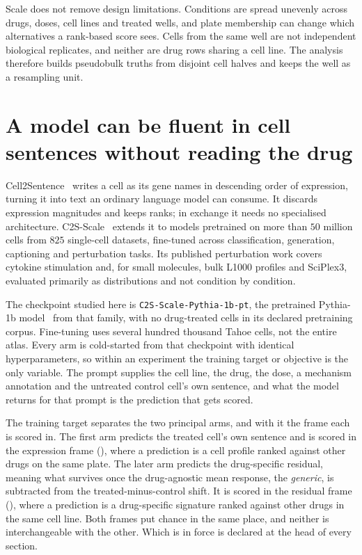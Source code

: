 Scale does not remove design limitations. Conditions are spread unevenly across
drugs, doses, cell lines and treated wells, and plate membership can change
which alternatives a rank-based score sees. Cells from the same well are not
independent biological replicates, and neither are drug rows sharing a cell
line. The analysis therefore builds pseudobulk truths from disjoint cell halves
and keeps the well as a resampling unit.

\section{A model can be fluent in cell sentences without reading the drug}
\label{sec:intro-model}

Cell2Sentence~\cite{c2s} writes a cell as its gene names in descending order of
expression, turning it into text an ordinary language model can
consume. It discards expression
magnitudes and keeps ranks; in exchange it needs no specialised architecture.
C2S-Scale~\cite{c2sscale} extends it to models pretrained on more than $50$
million cells from $825$ single-cell datasets, fine-tuned across
classification, generation, captioning and perturbation tasks. Its published
perturbation work covers cytokine stimulation and, for small molecules, bulk
L1000 profiles and SciPlex3, evaluated primarily as distributions and not
condition by condition.

The checkpoint studied here is
\texttt{C2S-Scale-}\allowbreak\texttt{Pythia-}\allowbreak\texttt{1b-pt}, the
pretrained Pythia-1b model~\cite{pythia} from that family, with no drug-treated
cells in its declared pretraining corpus. Fine-tuning uses several hundred
thousand Tahoe cells, not the entire atlas. Every arm is cold-started from that
checkpoint with identical hyperparameters, so within an experiment the training
target or objective is the only variable. The prompt supplies the cell line, the
drug, the dose, a mechanism annotation and the untreated control cell's own
sentence, and what the model returns for that prompt is the prediction that gets
scored.

The training target separates the two principal arms, and with it the frame each
is scored in. The first arm predicts the treated cell's own sentence and is
scored in the expression frame (\Eframe), where a prediction is a cell profile
ranked against other drugs on the same plate. The later arm predicts the
drug-specific residual, meaning what survives once the drug-agnostic mean
response, the \emph{generic}, is subtracted from the treated-minus-control
shift. It is scored in the residual frame (\Rframe), where a prediction is a
drug-specific signature ranked against other drugs in the same cell line. Both
frames put chance in the same place, and neither is interchangeable with the
other. Which is in force is declared at the head of every section.


